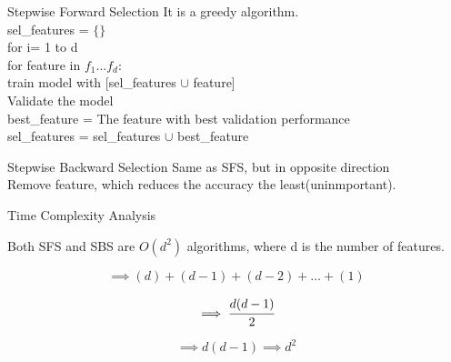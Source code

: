 \documentclass{beamer}
\begin{document}
\begin{frame}{Stepwise Forward Selection}
    \pause It is a greedy algorithm.\\
    sel\_features = $\{\}$\\
    for i= 1 to d\\
    \hspace{1em} for feature in $f_{1} \dots f_{d}$:\\
    \hspace{2em} train model with [sel\_features $\cup$ feature]\\
    \hspace{2em} Validate the model\\
    
    \hspace{1em} best\_feature  = The feature with best validation performance\\
    sel\_features = sel\_features $\cup$ best\_feature
    
\end{frame}

\begin{frame}{Stepwise Backward Selection}
    Same as SFS, but in opposite direction\\
    Remove feature, which reduces the accuracy the least(uninmportant).
\end{frame}

\begin{frame}{Time Complexity Analysis}
    
    Both SFS and SBS are $O(d^2)$ algorithms, where d is the number of features.
    
     \begin{equation*}
         \implies (d) + (d-1) + (d-2) + \dots + (1)
           \end{equation*}
     
     \begin{equation*}
          \implies \cfrac{d(d-1)}{2}
            \end{equation*}
     
     \begin{equation*}
         \implies d(d-1)  \implies d^{2}
           \end{equation*}
\end{frame}
\end{document}

